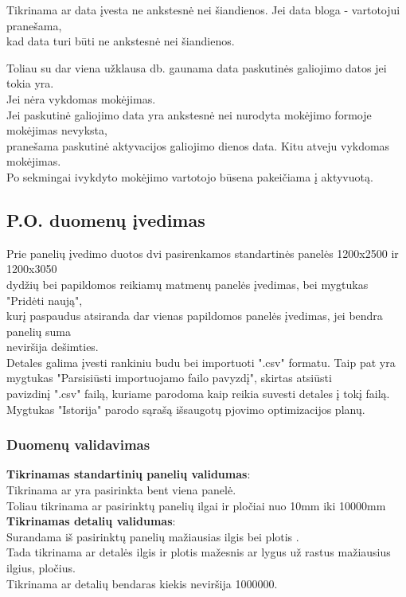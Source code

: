 \documentclass[a4paper,12pt]{article}
\begin{document}
Tikrinama ar data įvesta ne ankstesnė nei šiandienos. Jei data bloga - vartotojui pranešama, \\
kad data turi būti ne ankstesnė nei šiandienos.

Toliau su dar viena užklausa db. gaunama data paskutinės galiojimo datos jei tokia yra. \\
Jei nėra vykdomas mokėjimas. \\
Jei paskutinė galiojimo data yra ankstesnė nei nurodyta mokėjimo formoje mokėjimas nevyksta, \\
pranešama paskutinė aktyvacijos galiojimo dienos data. Kitu atveju vykdomas mokėjimas. \\

Po sekmingai ivykdyto mokėjimo vartotojo būsena pakeičiama į aktyvuotą.
 
	
	
\subsection{ P.O. duomenų įvedimas }

Prie panelių įvedimo duotos dvi pasirenkamos standartinės panelės 1200x2500 ir 1200x3050\\ 
dydžių bei papildomos reikiamų matmenų panelės įvedimas, bei mygtukas "Pridėti naują", \\
kurį paspaudus atsiranda dar vienas papildomos panelės įvedimas, jei bendra panelių suma \\
neviršija dešimties. \\
Detales galima įvesti rankiniu budu bei importuoti ".csv" formatu. 
Taip pat yra mygtukas "Parsisiūsti importuojamo failo pavyzdį", skirtas atsiūsti \\
pavizdinį ".csv" failą, kuriame parodoma kaip reikia suvesti detales į tokį failą. \\
Mygtukas "Istorija" parodo sąrašą išsaugotų pjovimo optimizacijos planų.

\subsubsection{Duomenų validavimas}
\textbf{Tikrinamas standartinių panelių validumas}:\\
	Tikrinama ar yra pasirinkta bent viena panelė. \\
	Toliau tikrinama ar pasirinktų panelių ilgai ir pločiai nuo 10mm iki 10000mm \\


\textbf{Tikrinamas detalių validumas}:\\
	Surandama iš pasirinktų panelių mažiausias ilgis bei plotis .\\
	Tada tikrinama ar detalės ilgis ir plotis mažesnis ar lygus už rastus mažiausius ilgius, pločius.\\
	Tikrinama ar detalių bendaras kiekis neviršija 1000000. \\
\end{document}
